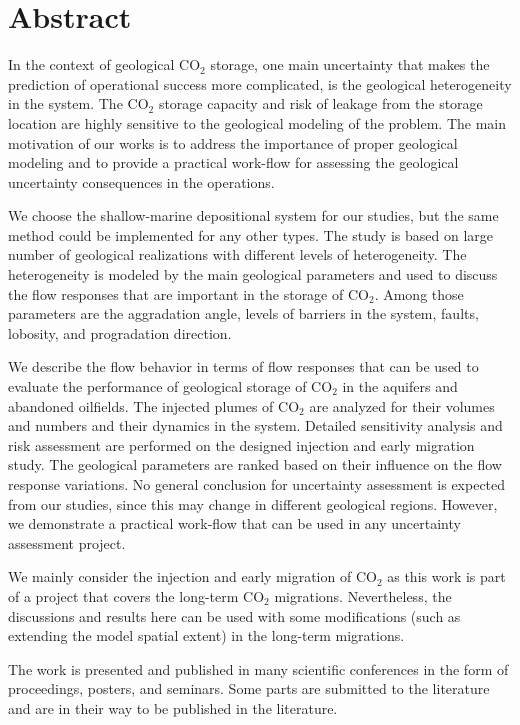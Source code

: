 \chapter{Abstract}

In the context of geological CO$_2$ storage, one main uncertainty that makes
the prediction of operational success more complicated, is the geological
heterogeneity in the system. The CO$_2$ storage capacity and risk of leakage
from the storage location are highly sensitive to the geological modeling of
the problem. The main motivation of our works is to address the
importance of proper geological modeling and to provide a practical work-flow
for assessing the geological uncertainty consequences in the operations.

We choose the shallow-marine depositional system for our studies, but the same
method could be implemented for any other types. The study is based on large
number of geological realizations with different levels of heterogeneity. The
heterogeneity is modeled by the main geological parameters and used to discuss
the flow responses that are important in the storage of CO$_2$. Among those
parameters are the aggradation angle, levels of barriers in the system, faults,
lobosity, and progradation direction. 

We describe the flow behavior in terms of flow responses that can be used to
evaluate the performance of geological storage of CO$_2$ in the aquifers and
abandoned oilfields. The injected plumes of CO$_2$ are analyzed for their
volumes and numbers and their dynamics in the system. Detailed sensitivity
analysis and risk assessment are performed on the designed injection and early
migration study. The geological parameters are ranked based on their influence
on the flow response variations. No general conclusion for uncertainty
assessment is expected from our studies, since this may change in different
geological regions. However, we demonstrate a practical work-flow that can be
used in any uncertainty assessment project.

We mainly consider the injection and early
migration of CO$_2$ as this work is part of a project that covers the long-term
CO$_2$ migrations. Nevertheless, the discussions and results here can be used
with some modifications (such as extending the model spatial extent) in the
long-term migrations.


The work is presented and published in many scientific conferences in the form
of proceedings, posters, and seminars. Some parts are submitted to the
literature and are in their way to be published in the literature.
